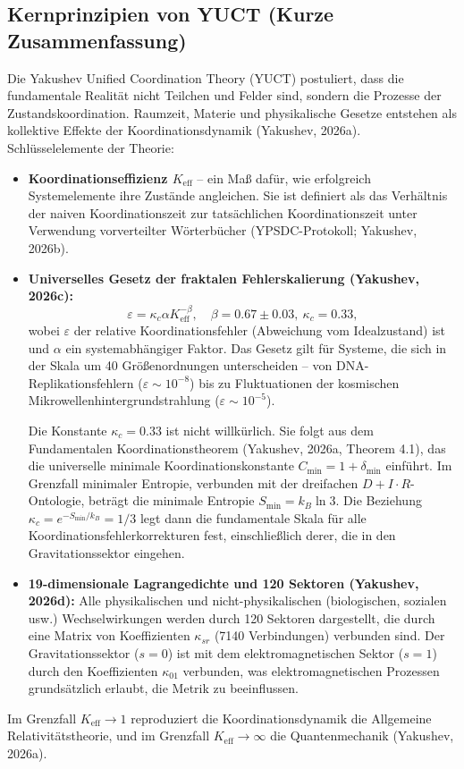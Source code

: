 \documentclass[12pt]{article}
\theoremstyle{remark}
\newcommand{\Keff}{K_{\mathrm{eff}}}
\newcommand{\eps}{\varepsilon}
\newcommand{\kappac}{\kappa_c}
\newcommand{\constmin}{C_{\min}}
\newcommand{\dint}{\ensuremath{D\!+\!I\!\cdot\!R}}
\begin{document}
	\subsection{Kernprinzipien von YUCT (Kurze Zusammenfassung)}
	\label{subsec:yuct-core}
	
	Die Yakushev Unified Coordination Theory (YUCT) postuliert, dass die fundamentale Realität nicht Teilchen und Felder sind, sondern die Prozesse der Zustandskoordination. Raumzeit, Materie und physikalische Gesetze entstehen als kollektive Effekte der Koordinationsdynamik (Yakushev, 2026a). Schlüsselelemente der Theorie:
	\begin{itemize}
		\item \textbf{Koordinationseffizienz $\Keff$} – ein Maß dafür, wie erfolgreich Systemelemente ihre Zustände angleichen. Sie ist definiert als das Verhältnis der naiven Koordinationszeit zur tatsächlichen Koordinationszeit unter Verwendung vorverteilter Wörterbücher (YPSDC-Protokoll; Yakushev, 2026b).
		\item \textbf{Universelles Gesetz der fraktalen Fehlerskalierung (Yakushev, 2026c):}
		\begin{equation}
			\eps = \kappac \alpha \Keff^{-\beta}, \quad \beta = 0.67 \pm 0.03, \ \kappac = 0.33,
			\label{eq:universal-scaling}
		\end{equation}
		wobei $\eps$ der relative Koordinationsfehler (Abweichung vom Idealzustand) ist und $\alpha$ ein systemabhängiger Faktor. Das Gesetz gilt für Systeme, die sich in der Skala um 40 Größenordnungen unterscheiden – von DNA-Replikationsfehlern ($\eps\sim 10^{-8}$) bis zu Fluktuationen der kosmischen Mikrowellenhintergrundstrahlung ($\eps\sim 10^{-5}$).
		
		Die Konstante $\kappac = 0.33$ ist nicht willkürlich. Sie folgt aus dem Fundamentalen Koordinationstheorem (Yakushev, 2026a, Theorem 4.1), das die universelle minimale Koordinationskonstante $\constmin = 1 + \delta_{\min}$ einführt. Im Grenzfall minimaler Entropie, verbunden mit der dreifachen $\dint$-Ontologie, beträgt die minimale Entropie $S_{\min} = k_B \ln 3$. Die Beziehung $\kappac = e^{-S_{\min}/k_B} = 1/3$ legt dann die fundamentale Skala für alle Koordinationsfehlerkorrekturen fest, einschließlich derer, die in den Gravitationssektor eingehen.
		
		\item \textbf{19-dimensionale Lagrangedichte und 120 Sektoren (Yakushev, 2026d):} Alle physikalischen und nicht-physikalischen (biologischen, sozialen usw.) Wechselwirkungen werden durch 120 Sektoren dargestellt, die durch eine Matrix von Koeffizienten $\kappa_{sr}$ (7140 Verbindungen) verbunden sind. Der Gravitationssektor ($s=0$) ist mit dem elektromagnetischen Sektor ($s=1$) durch den Koeffizienten $\kappa_{01}$ verbunden, was elektromagnetischen Prozessen grundsätzlich erlaubt, die Metrik zu beeinflussen.
	\end{itemize}
	Im Grenzfall $\Keff \to 1$ reproduziert die Koordinationsdynamik die Allgemeine Relativitätstheorie, und im Grenzfall $\Keff \to \infty$ die Quantenmechanik (Yakushev, 2026a).
	
\end{document}
